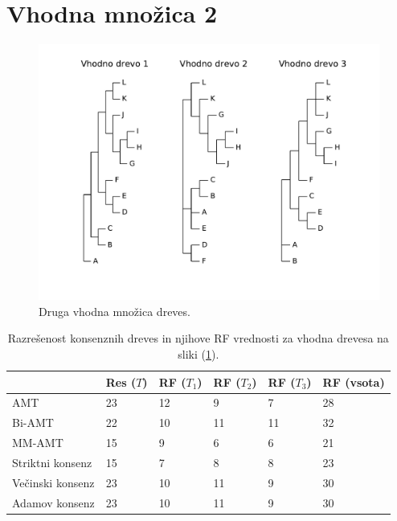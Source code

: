 \documentclass[a4paper, 12pt]{book}
\begin{document}
\section{Vhodna množica 2}
\begin{figure}[h!]
	\begin{center}
		\includegraphics[scale=0.50, clip=true, trim=1cm 2cm 1cm 0]{gfx/eval_input_2.pdf}
	\end{center}
	\caption{Druga vhodna množica dreves.}
	\label{img-eval-input-2}
\end{figure}

\begin{table}[h!]
	\begin{center}
	{\footnotesize
	\begin{tabular}{ l| l | l | l | l | l }
	~                & Res ($T$) & RF ($T_1$) & RF ($T_2$) & RF ($T_3$) & RF (vsota) \\ \hline
	AMT              & 23          & 12            & 9             & 7             & 28         \\ \hline
	Bi-AMT           & 22          & 10            & 11            & 11            & 32         \\ \hline
	MM-AMT           & 15          & 9             & 6             & 6             & 21         \\ \hline
	Striktni konsenz & 15          & 7             & 8             & 8             & 23         \\ \hline
	Večinski konsenz & 23          & 10            & 11            & 9             & 30         \\ \hline
	Adamov konsenz   & 23          & 10            & 11            & 9             & 30         \\ \hline
	\end{tabular}
	\caption{Razrešenost konsenznih dreves in njihove RF vrednosti za vhodna drevesa na sliki (\ref{img-eval-input-2}).}
	}
	\label{table-eval-2}
	\end{center}		
\end{table}
\end{document}
